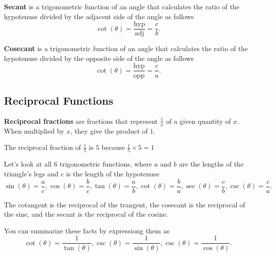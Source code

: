\begin{definition}[Secant]
	\label{def:secant}

	\textbf{Secant} is a trigonometric function of an angle that calculates
	the ratio of the hypotenuse divided by the adjacent side of the angle as
	follows
	\[%
		\cot(\theta) = \frac{\textrm{hyp}}{\textrm{adj}} = \frac{c}{b}
  .\]%
\end{definition}

\begin{definition}[Cosecant]
	\label{def:cosecant}

	\textbf{Cosecant} is a trigonometric function of an angle that calculates
	the ratio of the hypotenuse divided by the opposite side of the angle as
	follows
	\[%
		\cot(\theta) = \frac{\textrm{hyp}}{\textrm{opp}} = \frac{c}{a}
  .\]%
\end{definition}

\subsection{Reciprocal Functions}
\label{sub_sec:reciprocal_functions}

\begin{definition}
	\label{def:reciprocal_fractions}

	\textbf{Reciprocal fractions} are fractions that represent $\frac{1}{x}$ of a
	given quantity of $x$. When multiplied by $x$, they give the product of $1$.
\end{definition}

\begin{example}
	\label{exm:reciprocal_fractions}

	The reciprocal fraction of $\frac{1}{5}$ is $5$ because $\frac{1}{5} \times 5 = 1$
\end{example}

Let's look at all $6$ trigonometric functions, where $a$ and $b$ are the
lengths of the triangle's legs and $c$ is the length of the hypotenuse
\[%
	\sin(\theta) = \frac{a}{c}, \cos(\theta) = \frac{b}{c}, \tan(\theta) = \frac{a}{b}, \cot(\theta) = \frac{b}{a}, \sec(\theta) = \frac{c}{b}, \csc(\theta) = \frac{c}{a}
.\]%

The cotangent is the reciprocal of the trangent, the cosecant is the reciprocal
of the sine, and the secant is the reciprocal of the cosine.

You can summarize these facts by expressiong them as
\[%
	\cot(\theta) = \frac{1}{\tan(\theta)}, \csc(\theta) = \frac{1}{\sin(\theta)}, \csc(\theta) = \frac{1}{\cos(\theta)}
.\]%

